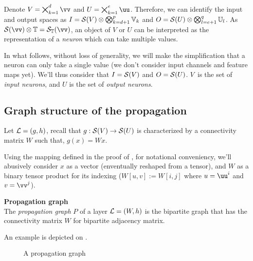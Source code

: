 Denote $V = \bigtimes_{k=1}^d \vv$ and $U = \bigtimes_{k=1}^e \uu$. Therefore, we can identify the input and output spaces as $I = \mathcal{S}(V) \otimes \bigotimes_{k=d+1}^p \mathbb{V}_k$ and $O =  \mathcal{S}(U) \otimes \bigotimes_{l=e+1}^q \mathbb{U}_l$. As $\cs(\vv) \otimes \bbt = \cs_{\bbt}(\vv)$, an object of $V$ or $U$ can be interpreted as the representation of a \emph{neuron} which can take multiple values.

In what follows, without loss of generality, we will make the simplification that a neuron can only take a single value (we don't consider input channels and feature maps yet). We'll thus consider that $I = \mathcal{S}(V)$ and $O = \mathcal{S}(U)$. $V$~is the set of \emph{input neurons}, and $U$ is the set of \emph{output neurons}.

\subsection{Graph structure of the propagation}

Let $\mathcal{L} = (g,h)$, recall that $g: \mathcal{S}(V) \rightarrow \mathcal{S}(U)$ is characterized by a connectivity matrix $W$ such that, $g(x) = Wx$.

\begin{remark}Using the mapping defined in the proof of , for notational conveniency, we'll abusively consider $x$ as a vector (enventually reshaped from a tensor), and $W$ as a binary tensor product for its indexing (\ie $W[u,v] := W[i,j]$ where $u = \uu^i$ and $v = \vv^j$).
\end{remark}


\begin{definition}\textbf{Propagation graph}\\
The \emph{propagation graph} $P$ of a layer $\mathcal{L} = (W,h)$ is the bipartite graph that has the connectivity matrix $W$ for bipartite adjacency matrix.
\end{definition}

An example is depicted on .

\begin{figure}[H]
\centering
{}
\caption{A propagation graph}
\label{fig:pgraph}
\end{figure}


